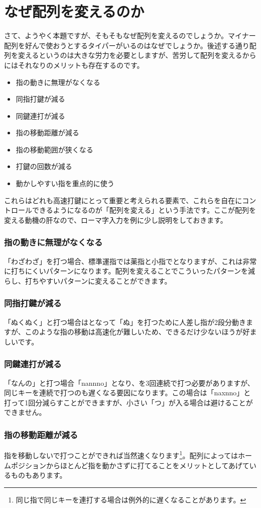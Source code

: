 \section{なぜ配列を変えるのか}

さて、ようやく本題ですが、そもそもなぜ配列を変えるのでしょうか。マイナー配列を好んで使おうとするタイパーがいるのはなぜでしょうか。後述する通り配列を変えるというのは大きな労力を必要としますが、苦労して配列を変えるからにはそれなりのメリットも存在するのです。

\begin{itemize}
 \item 指の動きに無理がなくなる
 \item 同指打鍵が減る
 \item 同鍵連打が減る
 \item 指の移動距離が減る
 \item 指の移動範囲が狭くなる
 \item 打鍵の回数が減る
 \item 動かしやすい指を重点的に使う
\end{itemize}
これらはどれも高速打鍵にとって重要と考えられる要素で、これらを自在にコントロールできるようになるのが「配列を変える」という手法です。ここが配列を変える動機の肝なので、ローマ字入力を例に少し説明をしておきます。

\subsubsection*{指の動きに無理がなくなる}
「わざわざ」を打つ場合、標準運指では薬指と小指でとなりますが、これは非常に打ちにくいパターンになります。配列を変えることでこういったパターンを減らし、打ちやすいパターンに変えることができます。
\subsubsection*{同指打鍵が減る}
「ぬくぬく」と打つ場合はとなって「ぬ」を打つために人差し指が2段分動きますが、このような指の移動は高速化が難しいため、できるだけ少ないほうが好ましいです。
\subsubsection*{同鍵連打が減る}
「なんの」と打つ場合「nannno」となり、を3回連続で打つ必要がありますが、同じキーを連続で打つのも遅くなる要因になります。この場合は「naxnno」と打って1回分減らすことができますが、小さい「つ」が入る場合は避けることができません。
\subsubsection*{指の移動距離が減る}
指を移動しないで打つことができれば当然速くなります\footnote{同じ指で同じキーを連打する場合は例外的に遅くなることがあります。}。配列によってはホームポジションからほとんど指を動かさずに打てることをメリットとしてあげているものもあります。
